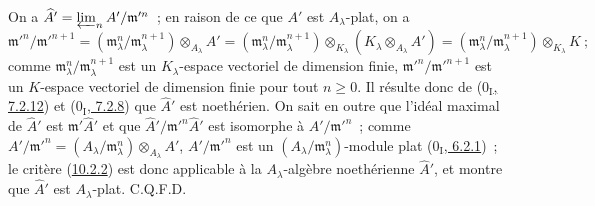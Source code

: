 On a $\widehat A'=\varprojlim_n A'/\mathfrak m'^{n}$~; en raison de ce que
$A'$ est $A_\lambda$-plat, on a
\[
  \mathfrak m'^{n}/\mathfrak m'^{n+1}
  =(\mathfrak m_\lambda^n/\mathfrak m_\lambda^{n+1})
    \otimes_{A_\lambda}A'
  =(\mathfrak m_\lambda^n/\mathfrak m_\lambda^{n+1})
    \otimes_{K_\lambda}(K_\lambda\otimes_{A_\lambda}A')
  =(\mathfrak m_\lambda^n/\mathfrak m_\lambda^{n+1})
    \otimes_{K_\lambda}K~;
\]
comme $\mathfrak m_\lambda^n/\mathfrak m_\lambda^{n+1}$ est un
$K_\lambda$-espace vectoriel de dimension finie,
$\mathfrak m'^{n}/\mathfrak m'^{n+1}$ est un $K$-espace vectoriel de
dimension finie pour tout $n\geq0$. Il résulte donc de
(\hyperref[0.7.2.12-fr]{$0_{\mathrm I}$, 7.2.12}) et
(\hyperref[0.7.2.8-fr]{$0_{\mathrm I}$, 7.2.8}) que $\widehat A'$ est
noethérien. On sait en outre que l'idéal maximal de $\widehat A'$ est
$\mathfrak m'\widehat A'$ et que
$\widehat A'/\mathfrak m'^{n}\widehat A'$ est isomorphe à
$A'/\mathfrak m'^{n}$~; comme
$A'/\mathfrak m'^{n}=(A_\lambda/\mathfrak m_\lambda^n)
\otimes_{A_\lambda}A'$, $A'/\mathfrak m'^{n}$ est un
$(A_\lambda/\mathfrak m_\lambda^n)$-module plat
(\hyperref[0.6.2.1-fr]{$0_{\mathrm I}$, 6.2.1})~; le critère
(\hyperref[0.10.2.2-fr]{10.2.2}) est donc applicable à la
$A_\lambda$-algèbre noethérienne $\widehat A'$, et montre que $\widehat A'$
est $A_\lambda$-plat. C.Q.F.D.

